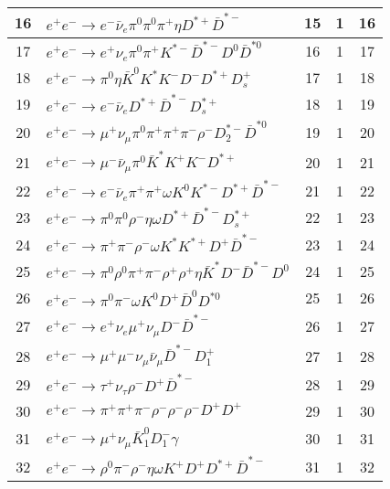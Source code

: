 \documentclass[landscape]{article}
\begin{document}
\begin{table}[htbp!]
\begin{tabular}{|c|>{\centering}p{18cm}|c|c|c|}
\hline
16 & $ e^{+} e^{-} \rightarrow e^{-} \bar{\nu}_{e} \pi^{0} \pi^{0} \pi^{+} \eta D^{*+} \bar{D}^{*-} $ & 15 & 1 & 16 \\
\hline
17 & $ e^{+} e^{-} \rightarrow e^{+} \nu_{e} \pi^{0} \pi^{+} K^{*-} \bar{D}^{*-} D^{0} \bar{D}^{*0} $ & 16 & 1 & 17 \\
\hline
18 & $ e^{+} e^{-} \rightarrow \pi^{0} \eta \bar{K}^{0} K^{*} K^{-} D^{-} D^{*+} D_{s}^{+} $ & 17 & 1 & 18 \\
\hline
19 & $ e^{+} e^{-} \rightarrow e^{-} \bar{\nu}_{e} D^{*+} \bar{D}^{*-} D_{s}^{*+} $ & 18 & 1 & 19 \\
\hline
20 & $ e^{+} e^{-} \rightarrow \mu^{+} \nu_{\mu} \pi^{0} \pi^{+} \pi^{+} \pi^{-} \rho^{-} D_{2}^{*-} \bar{D}^{*0} $ & 19 & 1 & 20 \\
\hline
21 & $ e^{+} e^{-} \rightarrow \mu^{-} \bar{\nu}_{\mu} \pi^{0} \bar{K}^{*} K^{+} K^{-} D^{*+} $ & 20 & 1 & 21 \\
\hline
22 & $ e^{+} e^{-} \rightarrow e^{-} \bar{\nu}_{e} \pi^{+} \pi^{+} \omega K^{0} K^{*-} D^{*+} \bar{D}^{*-} $ & 21 & 1 & 22 \\
\hline
23 & $ e^{+} e^{-} \rightarrow \pi^{0} \pi^{0} \rho^{-} \eta \omega D^{*+} \bar{D}^{*-} D_{s}^{*+} $ & 22 & 1 & 23 \\
\hline
24 & $ e^{+} e^{-} \rightarrow \pi^{+} \pi^{-} \rho^{-} \omega K^{*} K^{*+} D^{+} \bar{D}^{*-} $ & 23 & 1 & 24 \\
\hline
25 & $ e^{+} e^{-} \rightarrow \pi^{0} \rho^{0} \pi^{+} \pi^{-} \rho^{+} \rho^{+} \eta \bar{K}^{*} D^{-} \bar{D}^{*-} D^{0} $ & 24 & 1 & 25 \\
\hline
26 & $ e^{+} e^{-} \rightarrow \pi^{0} \pi^{-} \omega K^{0} D^{+} \bar{D}^{0} D^{*0} $ & 25 & 1 & 26 \\
\hline
27 & $ e^{+} e^{-} \rightarrow e^{+} \nu_{e} \mu^{+} \nu_{\mu} D^{-} \bar{D}^{*-} $ & 26 & 1 & 27 \\
\hline
28 & $ e^{+} e^{-} \rightarrow \mu^{+} \mu^{-} \nu_{\mu} \bar{\nu}_{\mu} \bar{D}^{*-} D_{1}^{+} $ & 27 & 1 & 28 \\
\hline
29 & $ e^{+} e^{-} \rightarrow \tau^{+} \nu_{\tau} \rho^{-} D^{+} \bar{D}^{*-} $ & 28 & 1 & 29 \\
\hline
30 & $ e^{+} e^{-} \rightarrow \pi^{+} \pi^{+} \pi^{-} \rho^{-} \rho^{-} \rho^{-} D^{+} D^{+} $ & 29 & 1 & 30 \\
\hline
31 & $ e^{+} e^{-} \rightarrow \mu^{+} \nu_{\mu} \bar{K}_1^{0} D_{1}^{-} \gamma $ & 30 & 1 & 31 \\
\hline
32 & $ e^{+} e^{-} \rightarrow \rho^{0} \pi^{-} \rho^{-} \eta \omega K^{+} D^{+} D^{*+} \bar{D}^{*-} $ & 31 & 1 & 32 \\

\end{tabular}
\end{table}
\end{document}
